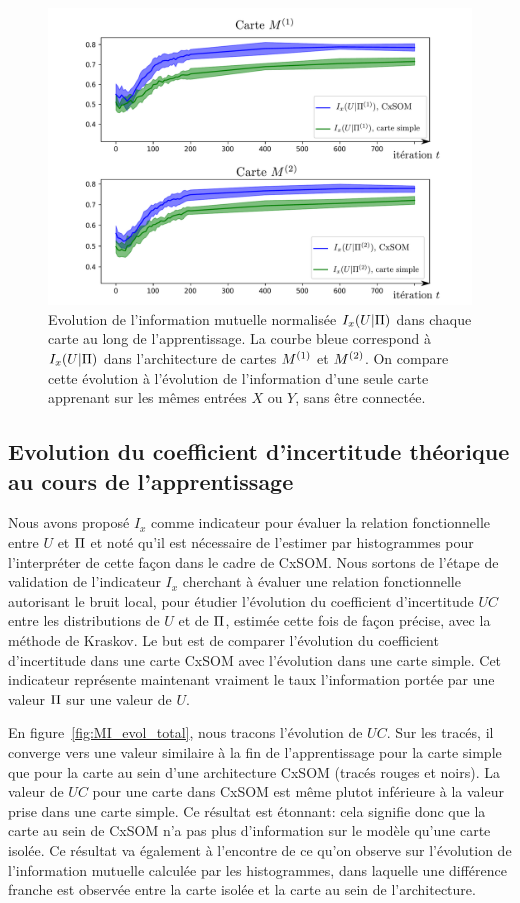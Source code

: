 \documentclass[../main]{subfiles}
\begin{document}
\begin{figure}
\includegraphics[width=\textwidth]{evolution_MI_binning}
\caption{Evolution de l'information mutuelle normalisée $I_x(U|\Pi)$ dans chaque carte au long de l'apprentissage. La courbe bleue correspond à $I_x(U|\Pi)$ dans l'architecture de cartes $M^{({1})}$ et $M^{({2})}$. On compare cette évolution à l'évolution de l'information d'une seule carte apprenant sur les mêmes entrées $X$ ou $Y$, sans être connectée.}
    \label{fig:MI_evol}
\end{figure}

\subsection{Evolution du coefficient d'incertitude théorique au cours de l'apprentissage}

Nous avons proposé $I_x$ comme indicateur pour évaluer la relation fonctionnelle entre $U$ et $\Pi$ et noté qu'il est nécessaire de l'estimer par histogrammes pour l'interpréter de cette façon dans le cadre de CxSOM.
Nous sortons de l'étape de validation de l'indicateur $I_x$ cherchant à évaluer une relation fonctionnelle autorisant le bruit local, pour étudier l'évolution du coefficient d'incertitude $UC$ entre les distributions de $U$ et de $\Pi$, estimée cette fois de façon précise, avec la méthode de Kraskov.
Le but est de comparer l'évolution du coefficient d'incertitude dans une carte CxSOM avec l'évolution dans une carte simple. Cet indicateur représente maintenant vraiment le taux l'information portée par une valeur $\Pi$ sur une valeur de $U$.

En figure~\ref{fig:MI_evol_total}, nous tracons l'évolution de $UC$.
Sur les tracés, il converge vers une valeur similaire à la fin de l'apprentissage pour la carte simple que pour la carte au sein d'une architecture CxSOM (tracés rouges et noirs). La valeur de $UC$ pour une carte dans CxSOM est même plutot inférieure à la valeur prise dans une carte simple.
Ce résultat est étonnant: cela signifie donc que la carte au sein de CxSOM n'a pas plus d'information sur le modèle qu'une carte isolée. Ce résultat va également à l'encontre de ce qu'on observe sur l'évolution de l'information mutuelle calculée par les histogrammes, dans laquelle une différence franche est observée entre la carte isolée et la carte au sein de l'architecture.
\end{document}
